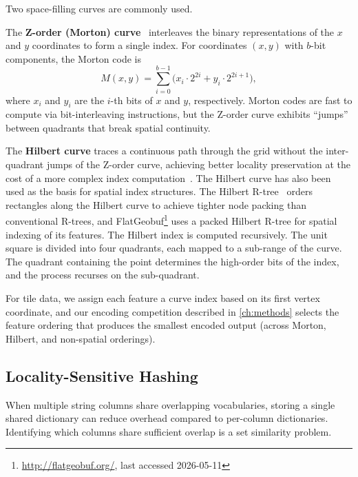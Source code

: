 Two space-filling curves are commonly used.

The \textbf{Z-order (Morton) curve}~\cite{morton1966computer} interleaves the binary representations of the $x$ and $y$ coordinates to form a single index.
For coordinates $(x, y)$ with $b$-bit components, the Morton code is
\begin{equation}\label{eq:morton}
    M(x, y) = \sum_{i=0}^{b-1} \bigl( x_i \cdot 2^{2i} + y_i \cdot 2^{2i+1} \bigr),
\end{equation}
where $x_i$ and $y_i$ are the $i$-th bits of $x$ and $y$, respectively.
Morton codes are fast to compute via bit-interleaving instructions, but the Z-order curve exhibits \enquote{jumps} between quadrants that break spatial continuity.

The \textbf{Hilbert curve} traces a continuous path through the grid without the inter-quadrant jumps of the Z-order curve, achieving better locality preservation at the cost of a more complex index computation~\cite{moonAnalysisClusteringProperties2001}.
The Hilbert curve has also been used as the basis for spatial index structures.
The Hilbert R-tree~\cite{kamelHilbertRtreeImproved1994} orders rectangles along the Hilbert curve to achieve tighter node packing than conventional R-trees, and FlatGeobuf\footnote{\url{http://flatgeobuf.org/}, last accessed 2026-05-11} uses a packed Hilbert R-tree for spatial indexing of its features.
The Hilbert index is computed recursively.
The unit square is divided into four quadrants, each mapped to a sub-range of the curve.
The quadrant containing the point determines the high-order bits of the index, and the process recurses on the sub-quadrant.

For tile data, we assign each feature a curve index based on its first vertex coordinate, and our encoding competition described in \cref{ch:methods} selects the feature ordering that produces the smallest encoded output (across Morton, Hilbert, and non-spatial orderings).

\subsection{Locality-Sensitive Hashing}\label{sub:lsh}

When multiple string columns share overlapping vocabularies, storing a single shared dictionary can reduce overhead compared to per-column dictionaries.
Identifying which columns share sufficient overlap is a set similarity problem.

